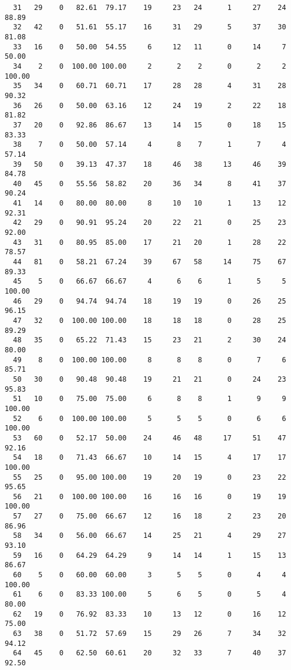 \begin{verbatim}
  31   29    0   82.61  79.17    19     23   24      1     27    24    88.89
  32   42    0   51.61  55.17    16     31   29      5     37    30    81.08
  33   16    0   50.00  54.55     6     12   11      0     14     7    50.00
  34    2    0  100.00 100.00     2      2    2      0      2     2   100.00
  35   34    0   60.71  60.71    17     28   28      4     31    28    90.32
  36   26    0   50.00  63.16    12     24   19      2     22    18    81.82
  37   20    0   92.86  86.67    13     14   15      0     18    15    83.33
  38    7    0   50.00  57.14     4      8    7      1      7     4    57.14
  39   50    0   39.13  47.37    18     46   38     13     46    39    84.78
  40   45    0   55.56  58.82    20     36   34      8     41    37    90.24
  41   14    0   80.00  80.00     8     10   10      1     13    12    92.31
  42   29    0   90.91  95.24    20     22   21      0     25    23    92.00
  43   31    0   80.95  85.00    17     21   20      1     28    22    78.57
  44   81    0   58.21  67.24    39     67   58     14     75    67    89.33
  45    5    0   66.67  66.67     4      6    6      1      5     5   100.00
  46   29    0   94.74  94.74    18     19   19      0     26    25    96.15
  47   32    0  100.00 100.00    18     18   18      0     28    25    89.29
  48   35    0   65.22  71.43    15     23   21      2     30    24    80.00
  49    8    0  100.00 100.00     8      8    8      0      7     6    85.71
  50   30    0   90.48  90.48    19     21   21      0     24    23    95.83
  51   10    0   75.00  75.00     6      8    8      1      9     9   100.00
  52    6    0  100.00 100.00     5      5    5      0      6     6   100.00
  53   60    0   52.17  50.00    24     46   48     17     51    47    92.16
  54   18    0   71.43  66.67    10     14   15      4     17    17   100.00
  55   25    0   95.00 100.00    19     20   19      0     23    22    95.65
  56   21    0  100.00 100.00    16     16   16      0     19    19   100.00
  57   27    0   75.00  66.67    12     16   18      2     23    20    86.96
  58   34    0   56.00  66.67    14     25   21      4     29    27    93.10
  59   16    0   64.29  64.29     9     14   14      1     15    13    86.67
  60    5    0   60.00  60.00     3      5    5      0      4     4   100.00
  61    6    0   83.33 100.00     5      6    5      0      5     4    80.00
  62   19    0   76.92  83.33    10     13   12      0     16    12    75.00
  63   38    0   51.72  57.69    15     29   26      7     34    32    94.12
  64   45    0   62.50  60.61    20     32   33      7     40    37    92.50

\end{verbatim}
